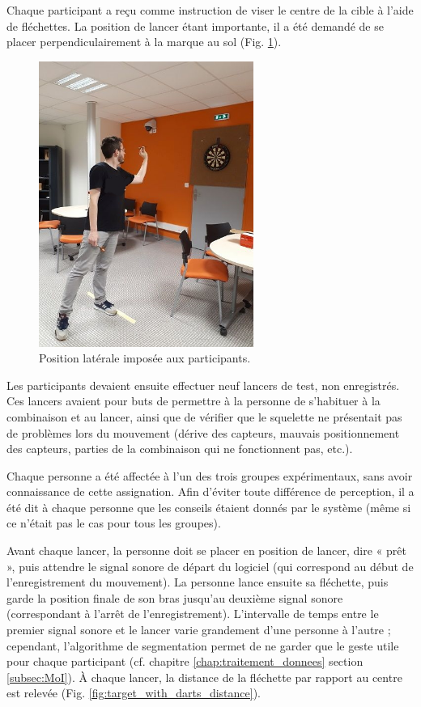 Chaque participant a reçu comme instruction de viser le centre de la cible à l'aide de fléchettes. La position de lancer étant importante, il a été demandé de se placer perpendiculairement à la marque au sol (Fig. \ref{fig:darts_position}).

\begin{figure}
    \centering
    \includegraphics[width=7cm]{pictures/darts_position.jpg}
    \caption{Position latérale imposée aux participants.}
    \label{fig:darts_position}
\end{figure}

Les participants devaient ensuite effectuer neuf lancers de test, non enregistrés. Ces lancers avaient pour buts de permettre à la personne de s'habituer à la combinaison et au lancer, ainsi que de vérifier que le squelette ne présentait pas de problèmes lors du mouvement (dérive des capteurs, mauvais positionnement des capteurs, parties de la combinaison qui ne fonctionnent pas, etc.).

Chaque personne a été affectée à l'un des trois groupes expérimentaux, sans avoir connaissance de cette assignation. Afin d'éviter toute différence de perception, il a été dit à chaque personne que les conseils étaient donnés par le système (même si ce n'était pas le cas pour tous les groupes).

Avant chaque lancer, la personne doit se placer en position de lancer, dire « prêt », puis attendre le signal sonore de départ du logiciel (qui correspond au début de l'enregistrement du mouvement). La personne lance ensuite sa fléchette, puis garde la position finale de son bras jusqu'au deuxième signal sonore (correspondant à l'arrêt de l'enregistrement). L'intervalle de temps entre le premier signal sonore et le lancer varie grandement d'une personne à l'autre ; cependant, l'algorithme de segmentation permet de ne garder que le geste utile pour chaque participant (cf. chapitre \ref{chap:traitement_donnees} section \ref{subsec:MoI}). À chaque lancer, la distance de la fléchette par rapport au centre est relevée (Fig. \ref{fig:target_with_darts_distance}).

